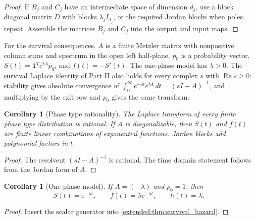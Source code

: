 \documentclass[11pt,a4paper]{article}
\newtheorem{corollary}[theorem]{Corollary}
\theoremstyle{definition}
\theoremstyle{remark}
\newcommand{\e}{\mathrm e}
\newcommand{\one}{\bm 1}
\begin{document}
\begin{proof}
If \(B_j\) and \(C_j\) have an intermediate space of dimension \(d_j\), use a block diagonal matrix \(D\) with blocks \(\lambda_j I_{d_j}\), or the required Jordan blocks when poles repeat. Assemble the matrices \(B_j\) and \(C_j\) into the output and input maps.
\end{proof}


For the survival consequences, $A$ is a finite Metzler matrix with nonpositive column sums and spectrum in the open left half-plane, $p_0$ is a probability vector, $S(t)=\one^T e^{tA}p_0$, and $f(t)=-S'(t)$. The one-phase model has $\lambda>0$. The survival Laplace identity of Part II also holds for every complex $s$ with $\operatorname{Re}s\geq0$: stability gives absolute convergence of $\int_0^\infty e^{-st}e^{tA}\,dt=(sI-A)^{-1}$, and multiplying by the exit row and $p_0$ gives the same transform.
\begin{corollary}[Phase type rationality]\label{earlier:record:024}\label{earlier:cor:phase_type_rationality}
The Laplace transform of every finite phase type distribution is rational. If \(A\) is diagonalizable, then \(S(t)\) and \(f(t)\) are finite linear combinations of exponential functions. Jordan blocks add polynomial factors in \(t\).
\end{corollary}

\begin{proof}
The resolvent \((sI-A)^{-1}\) is rational. The time domain statement follows from the Jordan form of \(A\).
\end{proof}

\begin{corollary}[One phase model]\label{earlier:record:025}\label{earlier:cor:one_phase_model}
If \(A=(-\lambda)\) and \(p_0=1\), then
\[
S(t)=\e^{-\lambda t},
\qquad
f(t)=\lambda\e^{-\lambda t},
\qquad
h(t)=\lambda.
\]
\end{corollary}

\begin{proof}
Insert the scalar generator into \cref{extended:thm:survival_hazard}.
\end{proof}
\end{document}
